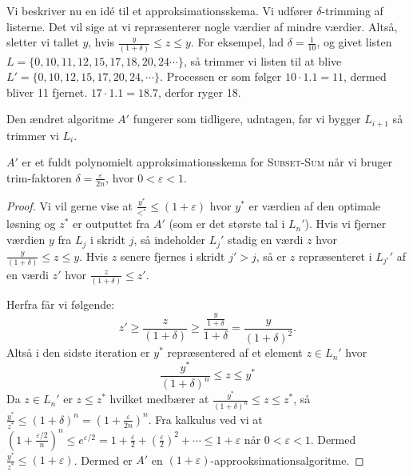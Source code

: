 Vi beskriver nu en idé til et approksimationsskema. Vi udfører \(\delta\)-trimming af listerne. Det vil sige at vi repræsenterer nogle værdier af mindre værdier. Altså, sletter vi tallet $y$, hvis $\frac{y}{(1+\delta)} \le z \le y$. For eksempel, lad $\delta = \frac{1}{10}$, og givet listen $L = \{0, 10, 11, 12, 15, 17, 18, 20, 24 \cdots\}$, så trimmer vi listen til at blive $L' = \{0, 10, 12, 15, 17, 20, 24, \cdots\}$. Processen er som følger ${10}\cdot{1.1} = 11$, dermed bliver 11 fjernet. $17 \cdot 1.1 = 18.7$, derfor ryger 18.

Den ændret algoritme $A'$ fungerer som tidligere, udntagen, før vi bygger $L_{i+1}$ så trimmer vi $L_i$.

\begin{theorem}
$A'$ er et fuldt polynomielt approksimationsskema for \textsc{Subset-Sum} når vi bruger trim-faktoren $\delta = \frac{\varepsilon}{2n}$, hvor $0 <\varepsilon <1$.
\end{theorem}
\begin{proof}
Vi vil gerne vise at $\frac{y^{*}}{<^{*}} \le (1+ \varepsilon)$ hvor $y^{*}$  er værdien af den optimale løsning og $z^{*}$ er outputtet fra $A'$ (som er det største tal i $L_{n}'$). Hvis vi fjerner værdien $y$ fra $L_{j}$ i skridt $j$, så indeholder $L_{j}'$ stadig en værdi $z$ hvor $\frac{y}{(1+\delta)} \le z \le y$. Hvis $z$ senere fjernes i skridt $j' > j$, så er $z$ repræsenteret i $L_{j'}'$  af en værdi $z'$ hvor $\frac{z}{(1+\delta)} \le z'$.

Herfra får vi følgende:
\begin{equation*}
z' \ge \frac{z}{(1+\delta)} \ge \frac{\frac{y}{1+\delta}}{1+\delta} = \frac{y}{(1+\delta)^{2}}.
\end{equation*}
Altså i den sidste iteration er $y^{*}$ repræsentered af et element $z \in L_{n}'$ hvor
\begin{equation}
\frac{y^{*}}{(1+\delta)^{n}} \le z \le y^{*}
\end{equation}
Da $z \in L_{n}'$ er $z \le z^{*}$ hvilket medbærer at $\frac{y^{*}}{(1+\delta)^{n}} \le z \le z^{*}$, så $\frac{y^{*}}{z^{*}} \le (1+\delta)^{n} = (1+ \frac{\varepsilon}{2n})^{n}$. Fra kalkulus ved vi at $(1+ \frac{\varepsilon/2}{n})^{n} \le e^{\varepsilon/2} = 1 + \frac{\varepsilon}{2}+ \left( \frac{\varepsilon}{2} \right)^{2} + \cdots \le 1 + \varepsilon$ når $0 < \varepsilon < 1$. Dermed $\frac{y^{*}}{z^{*}} \le (1+\varepsilon)$. Dermed er $A'$ en $(1+\varepsilon)$-approoksimationsalgoritme.
\end{proof}

